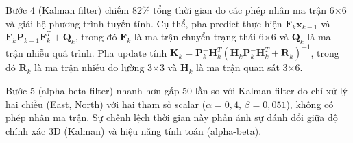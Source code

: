 \begin{table}[H]
\centering
{}
\caption{Chi tiết bảy bước trong chuỗi xử lý mỗi chu kỳ}
\label{tab:pipeline-steps}
\end{table}

Bước 4 (Kalman filter) chiếm 82\% tổng thời gian do các phép nhân ma trận 6$\times$6 và giải hệ phương trình tuyến tính. Cụ thể, pha predict thực hiện $\mathbf{F}_k \mathbf{x}_{k-1}$ và $\mathbf{F}_k \mathbf{P}_{k-1} \mathbf{F}_k^T + \mathbf{Q}_k$, trong đó $\mathbf{F}_k$ là ma trận chuyển trạng thái 6$\times$6 và $\mathbf{Q}_k$ là ma trận nhiễu quá trình. Pha update tính $\mathbf{K}_k = \mathbf{P}_k^- \mathbf{H}_k^T (\mathbf{H}_k \mathbf{P}_k^- \mathbf{H}_k^T + \mathbf{R}_k)^{-1}$, trong đó $\mathbf{R}_k$ là ma trận nhiễu đo lường 3$\times$3 và $\mathbf{H}_k$ là ma trận quan sát 3$\times$6.

Bước 5 (alpha-beta filter) nhanh hơn gấp 50 lần so với Kalman filter do chỉ xử lý hai chiều (East, North) với hai tham số scalar ($\alpha = 0,4$, $\beta = 0,051$), không có phép nhân ma trận. Sự chênh lệch thời gian này phản ánh sự đánh đổi giữa độ chính xác 3D (Kalman) và hiệu năng tính toán (alpha-beta).

